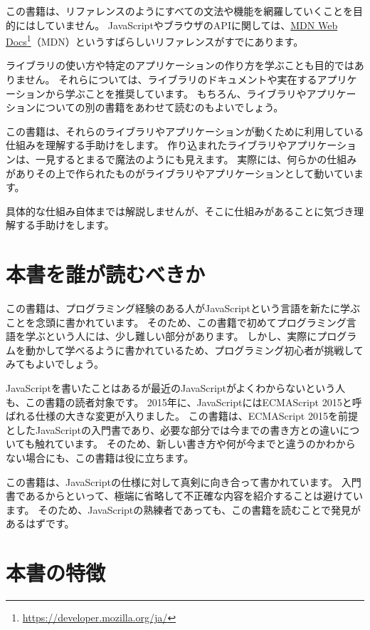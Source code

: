 この書籍は、リファレンスのようにすべての文法や機能を網羅していくことを目的にはしていません。
JavaScriptやブラウザのAPIに関しては、\href{https://developer.mozilla.org/ja/}{MDN
Web Docs}\footnote{\url{https://developer.mozilla.org/ja/}}（MDN）というすばらしいリファレンスがすでにあります。

ライブラリの使い方や特定のアプリケーションの作り方を学ぶことも目的ではありません。
それらについては、ライブラリのドキュメントや実在するアプリケーションから学ぶことを推奨しています。
もちろん、ライブラリやアプリケーションについての別の書籍をあわせて読むのもよいでしょう。

この書籍は、それらのライブラリやアプリケーションが動くために利用している仕組みを理解する手助けをします。
作り込まれたライブラリやアプリケーションは、一見するとまるで魔法のようにも見えます。
実際には、何らかの仕組みがありその上で作られたものがライブラリやアプリケーションとして動いています。

具体的な仕組み自体までは解説しませんが、そこに仕組みがあることに気づき理解する手助けをします。

\hypertarget{who-read}{%
\section*{本書を誰が読むべきか}\label{who-read}}

この書籍は、プログラミング経験のある人がJavaScriptという言語を新たに学ぶことを念頭に書かれています。
そのため、この書籍で初めてプログラミング言語を学ぶという人には、少し難しい部分があります。
しかし、実際にプログラムを動かして学べるように書かれているため、プログラミング初心者が挑戦してみてもよいでしょう。

JavaScriptを書いたことはあるが最近のJavaScriptがよくわからないという人も、この書籍の読者対象です。
2015年に、JavaScriptにはECMAScript
2015と呼ばれる仕様の大きな変更が入りました。 この書籍は、ECMAScript
2015を前提としたJavaScriptの入門書であり、必要な部分では今までの書き方との違いについても触れています。
そのため、新しい書き方や何が今までと違うのかわからない場合にも、この書籍は役に立ちます。

この書籍は、JavaScriptの仕様に対して真剣に向き合って書かれています。
入門書であるからといって、極端に省略して不正確な内容を紹介することは避けています。
そのため、JavaScriptの熟練者であっても、この書籍を読むことで発見があるはずです。

\hypertarget{features}{%
\section*{本書の特徴}\label{features}}

